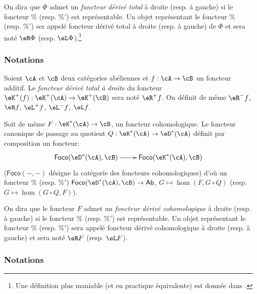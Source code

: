 \begin{definition}\label{VIII:4-1-2}
On dira que $\Phi$ admet un \emph{functeur d\'eriv\'e total} \`a droite (resp. 
\`a gauche) si le foncteur $\%$ (resp. $\%'$) est repr\'esentable. Un objet 
repr\'esentant le foncteur $\%$ (resp. $\%'$) ser appel\'e foncteur d\'eriv\'e 
total \`a droite (resp. \`a gauche) de $\Phi$ et sera not\'e 
$\eR \Phi$ (resp. $\eL \Phi$).\footnote{Une d\'efinition plus maniable (et en 
practique \'equivalente) est donn\'ee dans \cite[XVII 1.2]{sga4}.}
\end{definition}





\subsubsection{Notations}\label{VIII:4-1-3}

Soient $\cA$ et $\cB$ deux cat\'egories ab\'eliennes et $f:\cA\to \cB$ un 
foncteur additif. Le \emph{foncteur d\'eriv\'e total \`a droite} du foncteur 
$\eK^+(f):\eK^+(\cA) \to \eK^+(\cB)$ sera not\'e $\eR^+ f$. On d\'efinit de 
m\^eme $\eR^- f$, $\eR f$, $\eL^+ f$, $\eL^- f$, $\eL f$. 

Soit de m\^eme $F:\eK^\ast(\cA) \to \cB$, un foncteur cohomologique. Le 
foncteur canonique de passage au quotient $Q:\eK^\ast(\cA) \to \eD^\ast(\cA)$ 
d\'efinit par composition un foncteur: 
\[\xymatrix{
  \mathsf{Foco}(\eD^\ast(\cA),\cB) \ar[r] 
    & \mathsf{Foco}(\eK^\ast(\cA),\cB) 
}\]
($\mathsf{Foco}(-,-)$ d\'esigne la cat\'egorie des foncteurs cohomologiques) 
d'o\`u un foncteur $\%$ (resp. $\%'$) 
$\mathsf{Foco}(\eD^\ast(\cA),\cB) \to \mathsf{Ab}$, $G\mapsto \hom(F,G\circ Q)$ 
(resp. $G\mapsto \hom(G\circ Q,F)$). 





\begin{definition}\label{VIII:4-1-4}
On dira que le foncteur $F$ admet un \emph{foncteur d\'eriv\'e cohomologique} 
\`a droite (resp. \`a gauche) si le foncteur $\%$ (resp. $\%'$) est 
repr\'esentable. Un objet repr\'esentant le foncteur $\%$ (resp. $\%'$) sera 
appel\'e foncteur d\'eriv\'e cohomologique \`a droite (resp. \`a gauche) et 
sera not\'e $\eR F$ (resp. $\eL F$). 
\end{definition}





\subsubsection{Notations}\label{VIII:4-1-5}

